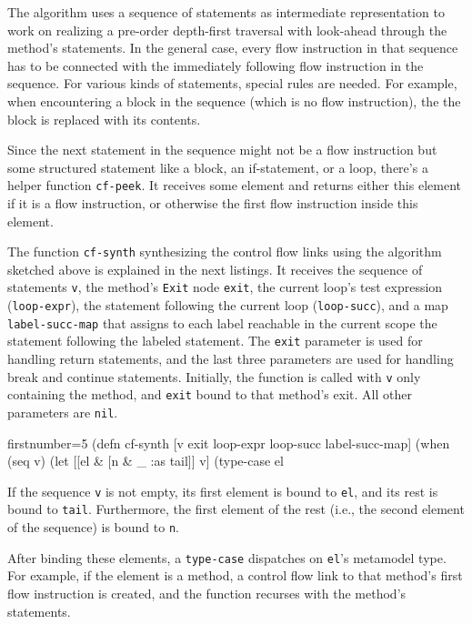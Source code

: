 \documentclass[submission]{eptcs}
\begin{document}
The algorithm uses a sequence of statements as intermediate representation to
work on realizing a pre-order depth-first traversal with look-ahead through the
method's statements.  In the general case, every flow instruction in that
sequence has to be connected with the immediately following flow instruction in
the sequence.  For various kinds of statements, special rules are needed.  For
example, when encountering a block in the sequence (which is no flow
instruction), the the block is replaced with its contents.

Since the next statement in the sequence might not be a flow instruction but
some structured statement like a block, an if-statement, or a loop, there's a
helper function \verb|cf-peek|.  It receives some element and returns either
this element if it is a flow instruction, or otherwise the first flow
instruction inside this element.

The function \verb|cf-synth| synthesizing the control flow links using the
algorithm sketched above is explained in the next listings.  It receives the
sequence of statements \verb|v|, the method's \verb|Exit| node \verb|exit|, the
current loop's test expression (\verb|loop-expr|), the statement following the
current loop (\verb|loop-succ|), and a map \verb|label-succ-map| that assigns
to each label reachable in the current scope the statement following the
labeled statement.  The \verb|exit| parameter is used for handling return
statements, and the last three parameters are used for handling break and
continue statements.  Initially, the function is called with \verb|v| only
containing the method, and \verb|exit| bound to that method's exit.  All other
parameters are \verb|nil|.

\begin{clojurecode*}{firstnumber=5}
(defn cf-synth [v exit loop-expr loop-succ label-succ-map]
  (when (seq v)
    (let [[el & [n & _ :as tail]] v]
      (type-case el
\end{clojurecode*}

If the sequence \verb|v| is not empty, its first element is bound to \verb|el|,
and its rest is bound to \verb|tail|.  Furthermore, the first element of the
rest (i.e., the second element of the sequence) is bound to \verb|n|.

After binding these elements, a \verb|type-case| dispatches on \verb|el|'s
metamodel type.  For example, if the element is a method, a control flow link
to that method's first flow instruction is created, and the function recurses
with the method's statements.
\end{document}
